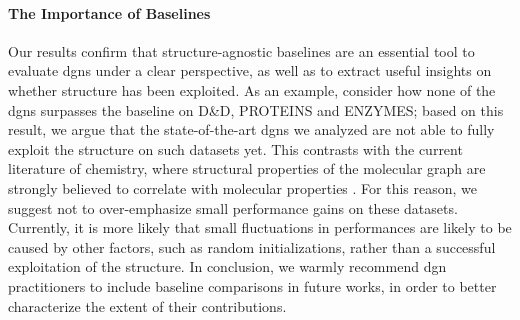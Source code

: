 

\paragraph{The Importance of Baselines}
Our results confirm that structure-agnostic baselines are an essential tool to evaluate \glspl{dgn} under a clear perspective, as well as to extract useful insights on whether structure has been exploited. As an example, consider how none of the \glspl{dgn} surpasses the baseline on D\&D, PROTEINS and ENZYMES; based on this result, we argue that the state-of-the-art \glspl{dgn} we analyzed are not able to fully exploit the structure on such datasets yet. This contrasts with the current literature of chemistry, where structural properties of the molecular graph are strongly believed to correlate with molecular properties \citep{?}. For this reason, we suggest not to over-emphasize small performance gains on these datasets. Currently, it is more likely that small fluctuations in performances are likely to be caused by other factors, such as random initializations, rather than a successful exploitation of the structure. In conclusion, we warmly recommend \gls{dgn} practitioners to include baseline comparisons in future works, in order to better characterize the extent of their contributions.



